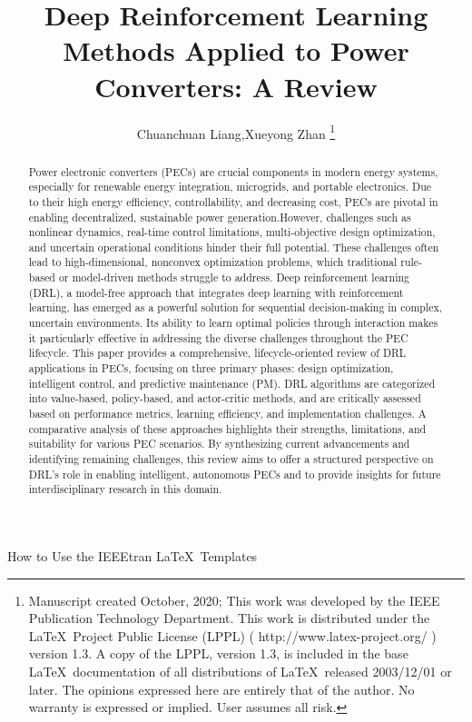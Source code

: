 \documentclass[lettersize,journal]{IEEEtran}
\begin{document}
\title{Deep Reinforcement Learning Methods Applied to Power Converters: A Review}
\author{Chuanchuan Liang,Xueyong Zhan
\thanks{Manuscript created October, 2020; This work was developed by the IEEE Publication Technology Department. This work is distributed under the \LaTeX \ Project Public License (LPPL) ( http://www.latex-project.org/ ) version 1.3. A copy of the LPPL, version 1.3, is included in the base \LaTeX \ documentation of all distributions of \LaTeX \ released 2003/12/01 or later. The opinions expressed here are entirely that of the author. No warranty is expressed or implied. User assumes all risk.}}

%
{How to Use the IEEEtran \LaTeX \ Templates}

\maketitle

\begin{abstract}
Power electronic converters (PECs) are crucial components in modern energy systems, especially for renewable energy integration, microgrids, and portable electronics. Due to their high energy efficiency, controllability, and decreasing cost, PECs are pivotal in enabling decentralized, sustainable power generation.However, challenges such as nonlinear dynamics, real-time control limitations, multi-objective design optimization, and uncertain operational conditions hinder their full potential. These challenges often lead to high-dimensional, nonconvex optimization problems, which traditional rule-based or model-driven methods struggle to address.
Deep reinforcement learning (DRL), a model-free approach that integrates deep learning with reinforcement learning, has emerged as a powerful solution for sequential decision-making in complex, uncertain environments. Its ability to learn optimal policies through interaction makes it particularly effective in addressing the diverse challenges throughout the PEC lifecycle. This paper provides a comprehensive, lifecycle-oriented review of DRL applications in PECs, focusing on three primary phases: design optimization, intelligent control, and predictive maintenance (PM). DRL algorithms are categorized into value-based, policy-based, and actor-critic methods, and are critically assessed based on performance metrics, learning efficiency, and implementation challenges. A comparative analysis of these approaches highlights their strengths, limitations, and suitability for various PEC scenarios. By synthesizing current advancements and identifying remaining challenges, this review aims to offer a structured perspective on DRL's role in enabling intelligent, autonomous PECs and to provide insights for future interdisciplinary research in this domain.

\end{abstract}
\end{document}
